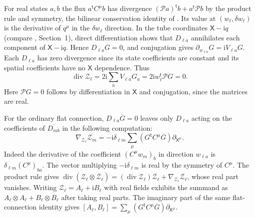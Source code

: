 For real states $a,b$ the flux $a^{\mathsf t}C^\mu b$ has divergence $(\mathcal P a)^{\mathsf t}b+a^{\mathsf t}\mathcal P b$ by the product rule and symmetry, the bilinear conservation identity of \cite{r-25}. Its value at $(w_\ell,\delta w_\ell)$ is the derivative of $q^\mu$ in the $\delta w_\ell$ direction. In the tube coordinates $\mathsf X-\mathrm i q$ (compare \cite{r-6}, Section~1), direct differentiation shows that $D_{\ell a}$ annihilates each component of $\mathsf X-\mathrm i q$. Hence $D_{\ell a}\overline G=0$, and conjugation gives $\partial_{w_{\ell a}}G=\mathrm i V_{\ell a}G$. Each $D_{\ell a}$ has zero divergence since its state coefficients are constant and its spatial coefficients have no $\mathsf X$ dependence. Thus
\[
\operatorname{div}\mathcal Z_\ell=2\mathrm i\sum_aV_{\ell a}G_a
=2\mathrm i w_\ell^{\mathsf t}\mathcal P G=0.
\]
Here $\mathcal P G=0$ follows by differentiation in $\mathsf X$ and conjugation, since the matrices are real.

For the ordinary flat connection, $D_{\ell a}\overline G=0$ leaves only $D_{\ell a}$ acting on the coefficients of $\overline{D_{mb}}$ in the following computation:
\[
\nabla_{\mathcal Z_\ell}\overline{\mathcal Z_m}
=-\mathrm i\delta_{\ell m}\sum_\mu(G^{\mathsf t}C^\mu\overline G)\partial_{\mathsf X^\mu}.
\]
Indeed the derivative of the coefficient $(C^\mu w_m)_b$ in direction $w_{\ell a}$ is $\delta_{\ell m}(C^\mu)_{ba}$. The vector multiplying $-\mathrm i\delta_{\ell m}$ is real by the symmetry of $C^\mu$. The product rule gives $\operatorname{div}(\mathcal Z_\ell\otimes\overline{\mathcal Z_\ell})=(\operatorname{div}\mathcal Z_\ell)\overline{\mathcal Z_\ell}+\nabla_{\mathcal Z_\ell}\overline{\mathcal Z_\ell}$, whose real part vanishes. Writing $\mathcal Z_\ell=A_\ell+\mathrm iB_\ell$ with real fields exhibits the summand as $A_\ell\otimes A_\ell+B_\ell\otimes B_\ell$ after taking real parts. The imaginary part of the same flat-connection identity gives $[A_\ell,B_\ell]=\sum_\mu(G^{\mathsf t}C^\mu\overline G)\partial_{\mathsf X^\mu}$.
